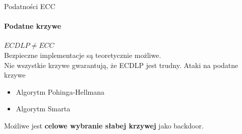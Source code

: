 

\begin{frame}{Podatności ECC}
\framesubtitle{Podatne krzywe}
\textbf{$ECDLP \neq ECC$} \\
\pause
Bezpieczne implementacje są teoretycznie możliwe. \\
\pause
Nie wszystkie krzywe gwarantują, że ECDLP jest trudny.
Ataki na podatne krzywe \cite{WeakCurvesInEllipticCurveCryptography}
\begin{itemize}
    \item Algorytm Pohinga-Hellmana
    \item Algorytm Smarta
\end{itemize}
\pause
\vspace{3mm}
Możliwe jest \textbf{celowe wybranie słabej krzywej} jako backdoor.
\end{frame}

